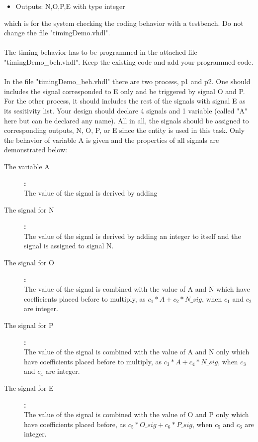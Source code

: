 \documentclass[a4paper,12pt]{article}
\begin{document}
\begin{itemize}
\item Outputs: N,O,P,E with type integer
\end{itemize}
which is for the system checking the coding behavior with a testbench. Do not change the file "timingDemo.vhdl".
\\
\\
The timing behavior has to be programmed in the attached file "timingDemo\_beh.vhdl".  Keep the existing code and add your programmed code.
\\
\\
In the file "timingDemo\_beh.vhdl" there are two process, p1 and p2. One should includes the signal corresponded to E only and be triggered by signal O and P. For the other process, it should includes the rest of the signals with signal E as its sesitivity list. Your design should declare 4 signals and 1 variable (called "A" here but can be declared any name). All in all, the signals should be assigned to corresponding outputs, N, O, P, or E since the entity is used in this task. Only the behavior of variable A is given and the properties of all signals are demonstrated below:
\begin{description}
\item [The variable A]\textbf{:} \\
The value of the signal is derived by adding %

\item [The signal for N]\textbf{:} \\
The value of the signal is derived by adding an integer to itself and the signal is assigned to signal N.

\item [The signal for O]\textbf{:} \\
The value of the signal is combined with the value of A and N which have coefficients placed before to multiply, as $c_{1} * A + c_{2} * N\_sig$, when $c_{1}$ and $c_{2}$ are integer.

\item [The signal for P]\textbf{:} \\
The value of the signal is combined with the value of A and N only which have coefficients placed before to multiply, as $c_{3} * A + c_{4} * N\_sig$, when $c_{3}$ and $c_{4}$ are integer. 

\item [The signal for E]\textbf{:} \\
The value of the signal is combined with the value of O and P only which have coefficients placed before, as $c_{5} * O\_sig + c_{6} * P\_sig$, when $c_{5}$ and $c_{6}$ are integer.
\\
\end{description}
\end{document}
